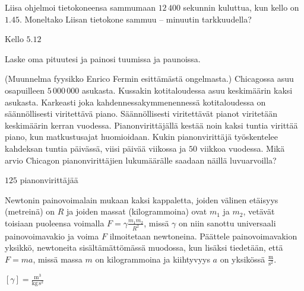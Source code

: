 \begin{tehtavasivu}
\begin{tehtava}
Liisa ohjelmoi tietokoneensa sammumaan $12\,400$ sekunnin kuluttua, kun kello on $1.45$. Moneltako Liisan tietokone sammuu -- minuutin tarkkuudella?
	\begin{vastaus}
Kello $5.12$
	\end{vastaus}
\end{tehtava}

\begin{tehtava}
Laske oma pituutesi ja painosi tuumissa ja paunoissa. %
\end{tehtava}

\begin{tehtava}
(Muunnelma fyysikko Enrico Fermin esittämästä ongelmasta.) Chicagossa asuu osapuilleen $5\,000\,000$ asukasta. Kussakin kotitaloudessa asuu keskimäärin kaksi asukasta. Karkeasti joka kahdennessakymmenennessä kotitaloudessa on säännöllisesti viritettävä piano. Säännöllisesti viritettävät pianot viritetään keskimäärin kerran vuodessa. Pianonvirittäjällä kestää noin kaksi tuntia virittää piano, kun matkustusajat huomioidaan. Kukin pianonvirittäjä työskentelee kahdeksan tuntia päivässä, viisi päivää viikossa ja $50$ viikkoa vuodessa. Mikä arvio Chicagon pianonvirittäjien lukumäärälle saadaan näillä luvuarvoilla?
	\begin{vastaus}
$125$ pianonvirittäjää
	\end{vastaus}
\end{tehtava}


\begin{tehtava}
Newtonin painovoimalain mukaan kaksi kappaletta, joiden välinen etäisyys (metreinä) on $R$ ja joiden massat (kilogrammoina) ovat $m_1$ ja $m_2$, vetävät toisiaan puoleensa voimalla $F=\gamma \frac{m_1m_2}{R^2}$, missä $\gamma$ on niin sanottu universaali painovoimavakio ja voima $F$ ilmoitetaan newtoneina. Päättele painovoimavakion yksikkö, newtoneita sisältämättömässä muodossa, kun lisäksi tiedetään, että $F=ma$, missä massa $m$ on kilogrammoina ja kiihtyvyys $a$ on yksikössä $\mathrm{\frac{m}{s^2}}$.
	\begin{vastaus}
	$[\gamma]=\mathrm{\frac{m^3}{kg\,s^2}}$
	\end{vastaus} 
\end{tehtava}

\end{tehtavasivu}